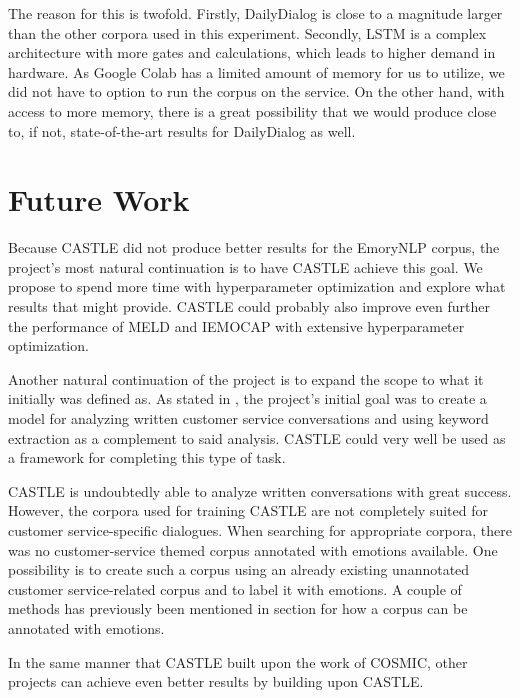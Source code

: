\documentclass[nofilelist]{cslthse-msc}
\begin{document}
The reason for this is twofold. Firstly, DailyDialog is close to a magnitude larger than the other corpora used in this experiment. Secondly, LSTM is a complex architecture with more gates and calculations, which leads to higher demand in hardware. As Google Colab has a limited amount of memory for us to utilize, we did not have to option to run the corpus on the service. On the other hand, with access to more memory, there is a great possibility that we would produce close to, if not, state-of-the-art results for DailyDialog as well. 

\section{Future Work}

\label{futurework}

Because CASTLE did not produce better results for the EmoryNLP corpus, the project's most natural continuation is to have CASTLE achieve this goal. We propose to spend more time with hyperparameter optimization and explore what results that might provide. CASTLE could probably also improve even further the performance of MELD and IEMOCAP with extensive hyperparameter optimization.  


Another natural continuation of the project is to expand the scope to what it initially was defined as. As stated in , the project's initial goal was to create a model for analyzing written customer service conversations and using keyword extraction as a complement to said analysis. CASTLE could very well be used as a framework for completing this type of task.


CASTLE is undoubtedly able to analyze written conversations with great success. However, the corpora used for training CASTLE are not completely suited for customer service-specific dialogues. When searching for appropriate corpora, there was no customer-service themed corpus annotated with emotions available. One possibility is to create such a corpus using an already existing unannotated customer service-related corpus and to label it with emotions. A couple of methods has previously been mentioned in section  for how a corpus can be annotated with emotions. 


In the same manner that CASTLE built upon the work of COSMIC, other projects can achieve even better results by building upon CASTLE. 
\end{document}

